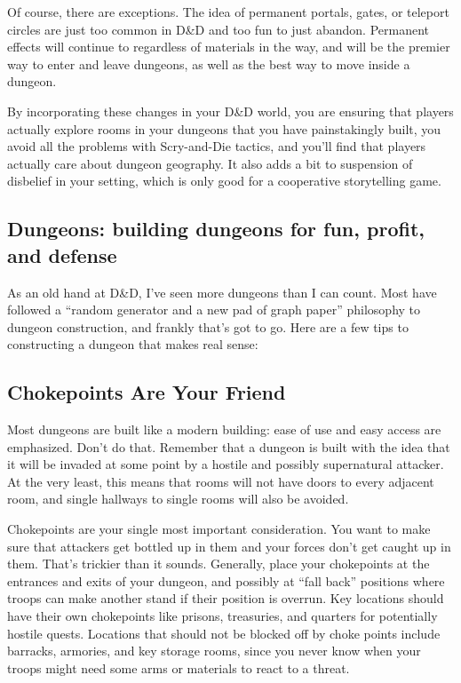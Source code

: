 Of course, there are exceptions. The idea of permanent portals, gates, or teleport circles are just too common in D\&D and too fun to just abandon. Permanent effects will continue to regardless of materials in the way, and will be the premier way to enter and leave dungeons, as well as the best way to move inside a dungeon.

By incorporating these changes in your D\&D world, you are ensuring that players actually explore rooms in your dungeons that you have painstakingly built, you avoid all the problems with Scry-and-Die tactics, and you'll find that players actually care about dungeon geography. It also adds a bit to suspension of disbelief in your setting, which is only good for a cooperative storytelling game.

\subsection{Dungeons: building dungeons for fun, profit, and defense}
As an old hand at D\&D, I've seen more dungeons than I can count. Most have followed a ``random generator and a new pad of graph paper'' philosophy to dungeon construction, and frankly that's got to go. Here are a few tips to constructing a dungeon that makes real sense:

\subsection{Chokepoints Are Your Friend}
Most dungeons are built like a modern building: ease of use and easy access are emphasized. Don't do that. Remember that a dungeon is built with the idea that it will be invaded at some point by a hostile and possibly supernatural attacker. At the very least, this means that rooms will not have doors to every adjacent room, and single hallways to single rooms will also be avoided.

Chokepoints are your single most important consideration. You want to make sure that attackers get bottled up in them and your forces don't get caught up in them. That's trickier than it sounds. Generally, place your chokepoints at the entrances and exits of your dungeon, and possibly at ``fall back'' positions where troops can make another stand if their position is overrun. Key locations should have their own chokepoints like prisons, treasuries, and quarters for potentially hostile quests. Locations that should not be blocked off by choke points include barracks, armories, and key storage rooms, since you never know when your troops might need some arms or materials to react to a threat.

